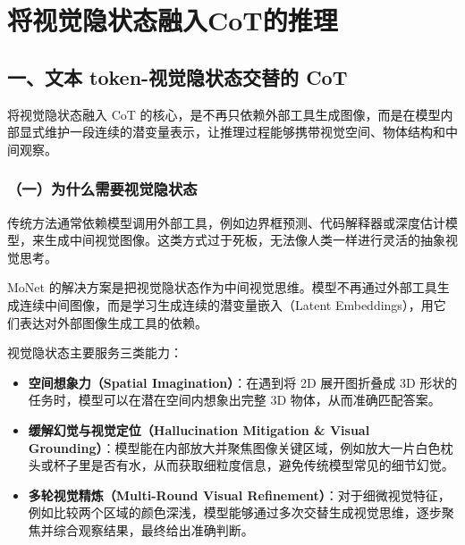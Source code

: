 \setcounter{section}{2}

\hypertarget{ux5c06ux89c6ux89c9ux9690ux72b6ux6001ux878dux5165cotux7684ux63a8ux7406}{%
\section{将视觉隐状态融入CoT的推理}\label{ux5c06ux89c6ux89c9ux9690ux72b6ux6001ux878dux5165cotux7684ux63a8ux7406}}

\hypertarget{ux4e00ux6587ux672c-token-ux89c6ux89c9ux9690ux72b6ux6001ux4ea4ux66ffux7684-cot}{%
\subsection{一、文本 token-视觉隐状态交替的 CoT}\label{ux4e00ux6587ux672c-token-ux89c6ux89c9ux9690ux72b6ux6001ux4ea4ux66ffux7684-cot}}

将视觉隐状态融入 CoT 的核心，是不再只依赖外部工具生成图像，而是在模型内部显式维护一段连续的潜变量表示，让推理过程能够携带视觉空间、物体结构和中间观察。

\hypertarget{ux4e00ux4e3aux4ec0ux4e48ux9700ux8981ux89c6ux89c9ux9690ux72b6ux6001}{%
\subsubsection{（一）为什么需要视觉隐状态}\label{ux4e00ux4e3aux4ec0ux4e48ux9700ux8981ux89c6ux89c9ux9690ux72b6ux6001}}

传统方法通常依赖模型调用外部工具，例如边界框预测、代码解释器或深度估计模型，来生成中间视觉图像。这类方式过于死板，无法像人类一样进行灵活的抽象视觉思考。

MoNet 的解决方案是把视觉隐状态作为中间视觉思维。模型不再通过外部工具生成连续中间图像，而是学习生成连续的潜变量嵌入（Latent Embeddings），用它们表达对外部图像生成工具的依赖。

视觉隐状态主要服务三类能力：

\begin{itemize}
\tightlist
\item
  \textbf{空间想象力（Spatial Imagination）}：在遇到将 2D 展开图折叠成 3D 形状的任务时，模型可以在潜在空间内想象出完整 3D 物体，从而准确匹配答案。
\item
  \textbf{缓解幻觉与视觉定位（Hallucination Mitigation \& Visual Grounding）}：模型能在内部放大并聚焦图像关键区域，例如放大一片白色枕头或杯子里是否有水，从而获取细粒度信息，避免传统模型常见的细节幻觉。
\item
  \textbf{多轮视觉精炼（Multi-Round Visual Refinement）}：对于细微视觉特征，例如比较两个区域的颜色深浅，模型能够通过多次交替生成视觉思维，逐步聚焦并综合观察结果，最终给出准确判断。
\end{itemize}

